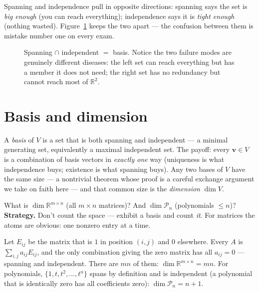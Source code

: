 Spanning and independence pull in opposite directions: spanning says the set is \emph{big enough} (you can reach everything); independence says it is \emph{tight enough} (nothing wasted). Figure~\ref{fig:spanindep} keeps the two apart — the confusion between them is mistake number one on every exam.

\begin{figure}[htbp]
\centering

\caption{Spanning $\cap$ independent $=$ basis. Notice the two failure modes are genuinely different diseases: the left set can reach everything but has a member it does not need; the right set has no redundancy but cannot reach most of $\mathbb{R}^2$.}
\label{fig:spanindep}
\end{figure}

\section{Basis and dimension}\label{sec:basisdim}

A \emph{basis} of $V$ is a set that is both spanning and independent — a minimal generating set, equivalently a maximal independent set. The payoff: every $\mathbf{v}\in V$ is a combination of basis vectors in \emph{exactly one} way (uniqueness is what independence buys; existence is what spanning buys). Any two bases of $V$ have the same size — a nontrivial theorem whose proof is a careful exchange argument we take on faith here — and that common size is the \emph{dimension} $\dim V$.

\begin{example}\label{ex:dimcount}
What is $\dim\mathbb{R}^{m\times n}$ (all $m\times n$ matrices)? And $\dim\mathcal{P}_n$ (polynomials $\le n$)?
\textbf{Strategy.} Don't count the space — exhibit a basis and count \emph{it}. For matrices the atoms are obvious: one nonzero entry at a time.
\begin{solution}
Let $E_{ij}$ be the matrix that is $1$ in position $(i,j)$ and $0$ elsewhere. Every $A$ is $\sum_{i,j}a_{ij}E_{ij}$, and the only combination giving the zero matrix has all $a_{ij}=0$ — spanning and independent. There are $mn$ of them: $\dim\mathbb{R}^{m\times n}=mn$. For polynomials, $\{1,t,t^2,\dots,t^n\}$ spans by definition and is independent (a polynomial that is identically zero has all coefficients zero): $\dim\mathcal{P}_n=n+1$.
\end{solution}
\end{example}


